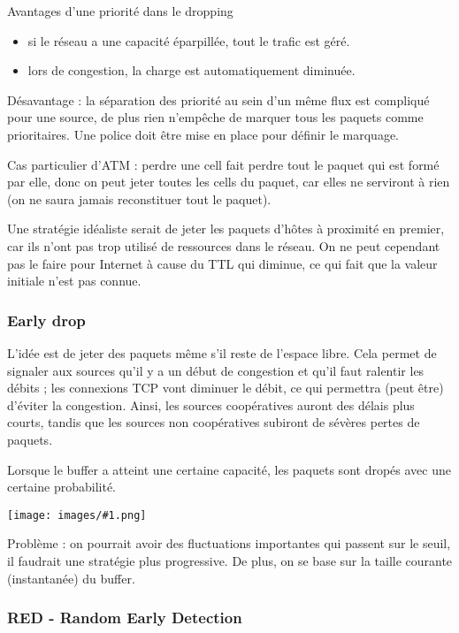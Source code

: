 \documentclass[10pt,a4paper]{report}
\newcommand{\dessin}[1]{\begin{center}\texttt{[image: images/\#1.png]}\end{center}}
\begin{document}
		Avantages d'une priorité dans le dropping
		
		\begin{itemize}
			\item si le réseau a une capacité éparpillée, tout le trafic est géré.
			\item lors de congestion, la charge est automatiquement diminuée.
		\end{itemize}
		
		Désavantage : la séparation des priorité au sein d'un même flux est compliqué pour une source, de plus rien n'empêche de marquer tous les paquets comme prioritaires. Une police doit être mise en place pour définir le marquage.
		
		Cas particulier d'ATM : perdre une cell fait perdre tout le paquet qui est formé par elle, donc on peut jeter toutes les cells du paquet, car elles ne serviront à rien (on ne saura jamais reconstituer tout le paquet).
		
		Une stratégie idéaliste serait de jeter les paquets d'hôtes à proximité en premier, car ils n'ont pas trop utilisé de ressources dans le réseau. On ne peut cependant pas le faire pour Internet à cause du TTL qui diminue, ce qui fait que la valeur initiale n'est pas connue.
		
			\subsubsection{Early drop}
			
			L'idée est de jeter des paquets même s'il reste de l'espace libre. Cela permet de signaler aux sources qu'il y a un début de congestion et qu'il faut ralentir les débits ; les connexions TCP vont diminuer le débit, ce qui permettra (peut être) d'éviter la congestion. Ainsi, les sources coopératives auront des délais plus courts, tandis que les sources non coopératives subiront de sévères pertes de paquets.
						
			Lorsque le buffer a atteint une certaine capacité, les paquets sont dropés avec une certaine probabilité.
			
			\dessin{110}
			
			Problème : on pourrait avoir des fluctuations importantes qui passent sur le seuil, il faudrait une stratégie plus progressive. De plus, on se base sur la taille courante (instantanée) du buffer.
			
			\subsubsection{RED - Random Early Detection}
		
\end{document}
